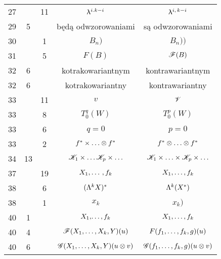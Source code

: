 \documentclass[a4paper,11pt]{article}
\begin{document}
\begin{center}
\begin{tabular}{|c|c|c|c|c|}
    27  & & 11 & $\uplambda^{ i. k - i }$ & $\uplambda^{ i,\, k - i }$ \\
    29  &  5 & & będą odwzorowaniami & są odwzorowaniami \\
    30  & &  1 & $B_{ n } )$ & $B_{ n } ) )$ \\
    31  & &  5 & $F( B )$ & $\mathcal{F}( B )$ \\
    32  &  6 & & kotrakowariantnym & kontrawariantnym \\
    32  &  6 & & kotrakowariantny & kontrawariantny \\
    33  & & 11 & $v$ & $\mathcal{V}$ \\
    33  & &  8 & $T_{ 0 }^{ q }( W )$ & $T_{ 0 }^{ p }( W )$ \\
    33  & &  6 & $q = 0$ & $p = 0$ \\
    33  & &  2 & $f^{ * } \times \ldots \otimes f^{ * }$
           & $f^{ * } \otimes \ldots \otimes f^{ * }$ \\
    34  & 13 & & $\mathcal{K}_{ 1 } \times \ldots \mathcal{K}_{ p } \times \ldots$
           & $\mathcal{K}_{ 1 } \times \ldots \times \mathcal{K}_{ p } \times \ldots$ \\
    37  & & 19 & $X_{ 1 }, \ldots\, , f_{ k }$ & $X_{ 1 }, \ldots , f_{ k }$ \\
    38  & &  6 & $( \Lambda^{ k } X )^{ * }$ & $\Lambda^{ k }( X^{ * } )$ \\
    38  & &  1 & $x_{ k }$ & $x_{ k } )$ \\
    40  &  1 & & $X_{ 1 }, \! \ldots , f_{ k }$ & $X_{ 1 }, \ldots , f_{ k }$ \\
    40  &  4 & & $\mathcal{F}( X_{ 1 }, \ldots, X_{ k }, Y )( u )$
           & $F( f_{ 1 }, \ldots, f_{ k }, g )( u )$ \\
    40  &  6 & & $\mathcal{G}( X_{ 1 }, \ldots, X_{ k }, Y )( u \otimes v )$
           & $\mathcal{G}( f_{ 1 }, \ldots, f_{ k }, g )( u \otimes v )$ \\
    \hline
  \end{tabular}


\end{center}
\end{document}
